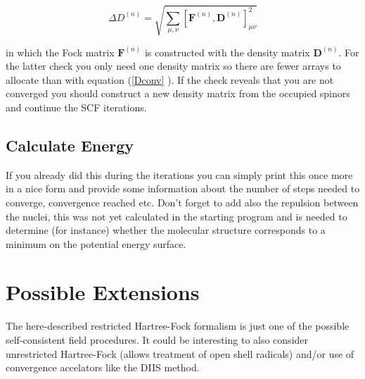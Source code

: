 \documentclass[11pt, bibliography=totoc]{scrartcl}
\begin{document}
\begin{equation} \label{conv} 
\Delta D^{(n)} =\sqrt{\sum_{\mu,\nu} \left[ \mathbf{F}^{(n)},\mathbf{D}^{(n)} \right]^2_{\mu\nu}}
 \end{equation}

in which the Fock matrix $\mathbf{F}^{(n)}$ is constructed with the density matrix $\mathbf{D}^{(n)}$.
For the latter check you only need one density matrix so there are fewer arrays to allocate than with equation (\ref{Dconv} ).
If the check reveals that you are not converged you should construct a new density matrix from the occupied spinors and continue the SCF iterations.

\subsection{Calculate Energy}
If you already did this during the iterations you can simply print this once more in a nice form and provide some information about the number of steps needed to converge, convergence reached etc. Don't forget to add also the repulsion between the nuclei, this was not yet calculated in the starting program and is needed to determine (for instance) whether the molecular structure corresponds to a minimum on the potential energy surface.

\section{Possible Extensions}
The here-described restricted Hartree-Fock formalism is just one of the possible self-consistent field procedures. It could be interesting to also consider unrestricted Hartree-Fock (allows treatment of open shell radicals) and/or use of convergence accelators like the DIIS method.





\end{document}
